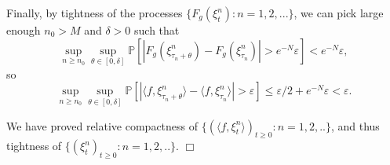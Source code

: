 \documentclass[12pt]{article}
\newenvironment {proof}{{\noindent\bf Proof }}{\hfill $\Box$ \medskip}
\begin{document}
\begin{proof}
Finally, by tightness of the processes $\{F_g(\xi^n_t): n = 1,2,...\}$, 
we can pick large enough $n_0 > M$ and $\delta > 0$
such that 
$$\sup_{n \geq n_0}\sup_{\theta \in [0,\delta]}\mathbb{P}\left[|F_g(\xi^n_{\tau_n+\theta})-F_g(\xi^n_{\tau_n})| > e^{-N}\varepsilon\right]< e^{-N}\varepsilon,$$
so
\begin{equation}
\sup_{n \geq n_0}\sup_{\theta \in [0, \delta]} \mathbb{P}\left[|\langle f, \xi^n_{\tau_n+\theta}\rangle - \langle f, \xi^n_{\tau_n}\rangle | > \varepsilon \right] \leq \varepsilon / 2 + e^{-N} \varepsilon < \varepsilon.
\end{equation}

We have proved relative compactness of $\{(\langle f, \xi^n_t \rangle )_{t \geq 0}: n=1,2,.. \}$, and thus tightness of 
 $\{(\xi^n_t )_{t \geq 0}: n=1,2,.. \}.$
\end{proof}





\end{document}
